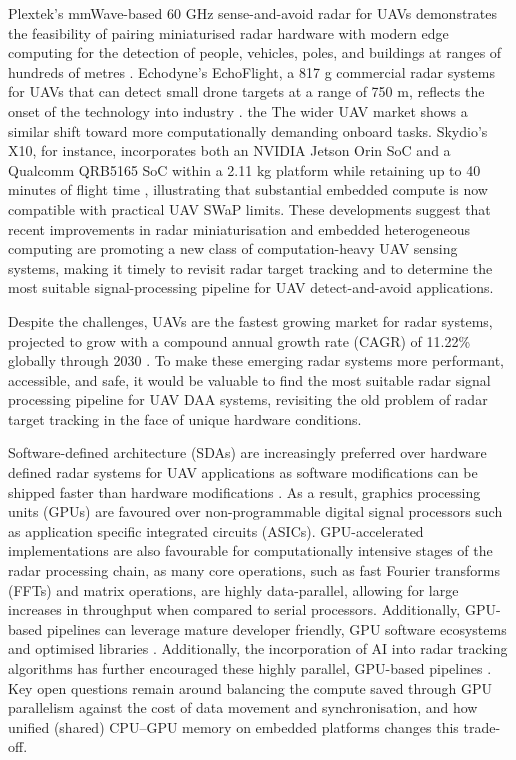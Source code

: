 Plextek’s mmWave-based 60 GHz sense-and-avoid radar for UAVs demonstrates the feasibility of pairing miniaturised radar hardware with modern edge computing for the detection of people, vehicles, poles, and buildings at ranges of hundreds of metres \cite{}. Echodyne's EchoFlight, a 817 g commercial radar systems for UAVs that can detect small drone targets at a range of 750 m, reflects the onset of the technology into industry \cite{Echodyne2024}. the The wider UAV market shows a similar shift toward more computationally demanding onboard tasks. Skydio’s X10, for instance, incorporates both an NVIDIA Jetson Orin SoC and a Qualcomm QRB5165 SoC within a 2.11 kg platform while retaining up to 40 minutes of flight time \cite{}, illustrating that substantial embedded compute is now compatible with practical UAV SWaP limits. These developments suggest that recent improvements in radar miniaturisation and embedded heterogeneous computing are promoting a new class of computation-heavy UAV sensing systems, making it timely to revisit radar target tracking and to determine the most suitable signal-processing pipeline for UAV detect-and-avoid applications. 

Despite the challenges, UAVs are the fastest growing market for radar systems, projected to grow with a compound annual growth rate (CAGR) of 11.22\% globally through 2030 \cite{mordor_airborne_radars_market_2025}. To make these emerging radar systems more performant, accessible, and safe, it would be valuable to find the most suitable radar signal processing pipeline for UAV DAA systems, revisiting the old problem of radar target tracking in the face of unique hardware conditions.

Software-defined architecture (SDAs) are increasingly preferred over hardware defined radar systems for UAV applications as software modifications can be shipped faster than hardware modifications \cite{mordor_airborne_radars_market_2025}. As a result, graphics processing units (GPUs) are favoured over non-programmable digital signal processors such as application specific integrated circuits (ASICs). GPU-accelerated implementations are also favourable for computationally intensive stages of the radar processing chain, as many core operations, such as fast Fourier transforms (FFTs) and matrix operations, are highly data-parallel, allowing for large increases in throughput when compared to serial processors. Additionally, GPU-based pipelines can leverage mature developer friendly, GPU software ecosystems and optimised libraries \cite{zaknoun2024_gpu_radar}. Additionally, the incorporation of AI into radar tracking algorithms has further encouraged these highly parallel, GPU-based pipelines \cite{electronics13214251}. Key open questions remain around balancing the compute saved through GPU parallelism against the cost of data movement and synchronisation, and how unified (shared) CPU--GPU memory on embedded platforms changes this trade-off. 

